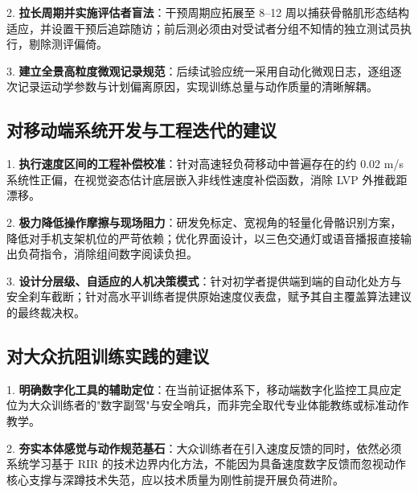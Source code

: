 \documentclass[UTF8,zihao=-4,twoside,openany]{ctexbook}
\begin{document}
2. \textbf{拉长周期并实施评估者盲法}：干预周期应拓展至 8--12 周以捕获骨骼肌形态结构适应，并设置干预后追踪随访；前后测必须由对受试者分组不知情的独立测试员执行，剔除测评偏倚。

3. \textbf{建立全景高粒度微观记录规范}：后续试验应统一采用自动化微观日志，逐组逐次记录运动学参数与计划偏离原因，实现训练总量与动作质量的清晰解耦。

\subsection{对移动端系统开发与工程迭代的建议}
1. \textbf{执行速度区间的工程补偿校准}：针对高速轻负荷移动中普遍存在的约 0.02 m/s 系统性正偏，在视觉姿态估计底层嵌入非线性速度补偿函数，消除 LVP 外推截距漂移。

2. \textbf{极力降低操作摩擦与现场阻力}：研发免标定、宽视角的轻量化骨骼识别方案，降低对手机支架机位的严苛依赖；优化界面设计，以三色交通灯或语音播报直接输出负荷指令，消除组间数字阅读负担。

3. \textbf{设计分层级、自适应的人机决策模式}：针对初学者提供端到端的自动化处方与安全刹车截断；针对高水平训练者提供原始速度仪表盘，赋予其自主覆盖算法建议的最终裁决权。

\subsection{对大众抗阻训练实践的建议}
1. \textbf{明确数字化工具的辅助定位}：在当前证据体系下，移动端数字化监控工具应定位为大众训练者的"数字副驾"与安全哨兵，而非完全取代专业体能教练或标准动作教学。

2. \textbf{夯实本体感觉与动作规范基石}：大众训练者在引入速度反馈的同时，依然必须系统学习基于 RIR 的技术边界内化方法，不能因为具备速度数字反馈而忽视动作核心支撑与深蹲技术失范，应以技术质量为刚性前提开展负荷进阶。
\clearpage
\end{document}
